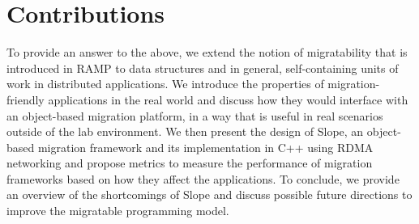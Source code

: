\section{Contributions}
To provide an answer to the above, we extend the notion of migratability that is
introduced in RAMP \cite{memon2018ramp} to data structures and in general,
self-containing units of work in distributed applications.
We introduce
the properties of migration-friendly applications in the real world and discuss
how they would interface with an object-based migration platform, in a way
that is useful in real scenarios outside of the lab environment.
We then present the design of Slope, an object-based migration framework
and its implementation in C++ using RDMA networking and propose metrics
to measure the performance of migration frameworks based on how they affect
the applications.
To conclude, we provide an overview of the shortcomings of Slope and
discuss possible future directions to improve the migratable programming model.

